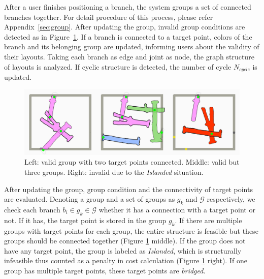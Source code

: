 After a user finishes positioning a branch, the system groups a set of connected branches together.
For detail procedure of this process, please refer Appendix~\ref{sec:group}.
After updating the group, invalid group conditions are detected as in Figure~\ref{fig:group}.
If a branch is connected to a target point, colors of the branch and its belonging group are updated, informing users about the validity of their layouts.
Taking each branch as edge and joint as node, the graph structure of layouts is analyzed.
If cyclic structure is detected, the number of cycle $N_{cycle}$ is updated.



\begin{figure}[ht]
  \begin{center}
    \includegraphics[width = 0.4\paperwidth]{images/interface/groups.jpg}
    \caption{Left: valid group with two target points connected. Middle: valid but three groups. Right: invalid due to the \textit{Islanded} situation. }
    \label{fig:group}
  \end{center}
\end{figure}

After updating the group, group condition and the connectivity of target points are evaluated.
Denoting a group and a set of groups as $g_k$ and $\mathcal{G}$ respectively, we check each branch $b_i \in g_k \in \mathcal{G}$ whether it has a connection with a target point or not.
If it has, the target point is stored in the group $g_k$.
If there are multiple groups with target points for each group, the entire structure is feasible but these groups should be connected together (Figure \ref{fig:group} middle).
If the group does not have any target point, the group is labeled as \textit{Islanded}, which is structurally infeasible thus counted as a penalty in cost calculation (Figure \ref{fig:group} right).
If one group has multiple target points, these target points are \textit{bridged}.

